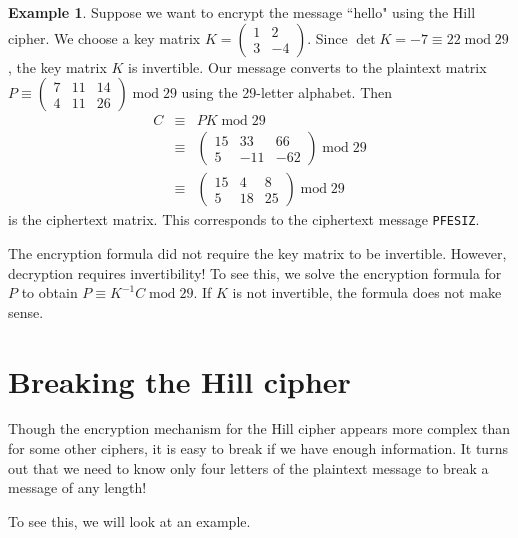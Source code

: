 \documentclass{book}
\theoremstyle{plain}
\theoremstyle{definition}
\newtheorem{example}[theorem]{Example}
\newcommand{\ciphertext}[1]{\texttt{#1}} %
\renewcommand{\mod}{\operatorname{mod}}
\renewcommand{\mod}{\operatorname{mod}}
\begin{document}
\begin{example}
Suppose we want to encrypt the message ``hello" using the Hill cipher. We choose a key matrix $K = \begin{pmatrix} 1 & 2 \\ 3 & -4 \end{pmatrix}$. Since $\det K = -7 \equiv 22 \mod 29$, the key matrix $K$ is invertible. Our message converts to the plaintext matrix $P \equiv \begin{pmatrix} 7 & 11 & 14 \\ 4 & 11 & 26 \end{pmatrix} \mod 29$ using the 29-letter alphabet. Then 
\begin{eqnarray*}
C &\equiv& PK \mod 29 \\
&\equiv& \begin{pmatrix} 15 & 33 & 66 \\ 5 & -11 & -62 \end{pmatrix} \mod 29 \\
&\equiv& \begin{pmatrix} 15 & 4 & 8 \\ 5 & 18 & 25 \end{pmatrix} \mod 29
\end{eqnarray*}
is the ciphertext matrix. This corresponds to the ciphertext message \ciphertext{PFESIZ}.
\end{example}

The encryption formula did not require the key matrix to be invertible. However, decryption requires invertibility! To see this, we solve the encryption formula for $P$ to obtain $P \equiv K^{-1}C \mod 29$. If $K$ is not invertible, the formula does not make sense.

\section{Breaking the Hill cipher}
Though the encryption mechanism for the Hill cipher appears more complex than for some other ciphers, it is easy to break if we have enough information. It turns out that we need to know only four letters of the plaintext message to break a message of any length!

To see this, we will look at an example.
\end{document}
